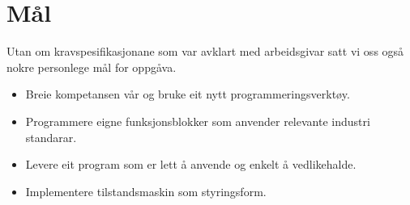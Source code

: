\section{Mål}
Utan om kravspesifikasjonane som var avklart med arbeidsgivar satt vi oss
også nokre personlege mål for oppgåva.

\begin{itemize}
    \item Breie kompetansen vår og bruke eit nytt programmeringsverktøy.
    \item Programmere eigne funksjonsblokker som anvender relevante industri standarar.
    \item Levere eit program som er lett å anvende og enkelt å vedlikehalde.
    \item Implementere tilstandsmaskin som styringsform.
\end{itemize}



